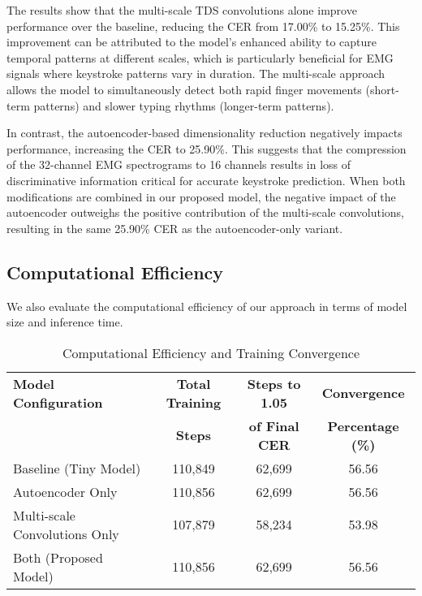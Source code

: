 The results show that the multi-scale TDS convolutions alone improve performance over the baseline, reducing the CER from 17.00\% to 15.25\%. This improvement can be attributed to the model's enhanced ability to capture temporal patterns at different scales, which is particularly beneficial for EMG signals where keystroke patterns vary in duration. The multi-scale approach allows the model to simultaneously detect both rapid finger movements (short-term patterns) and slower typing rhythms (longer-term patterns).

In contrast, the autoencoder-based dimensionality reduction negatively impacts performance, increasing the CER to 25.90\%. This suggests that the compression of the 32-channel EMG spectrograms to 16 channels results in loss of discriminative information critical for accurate keystroke prediction. When both modifications are combined in our proposed model, the negative impact of the autoencoder outweighs the positive contribution of the multi-scale convolutions, resulting in the same 25.90\% CER as the autoencoder-only variant.

\subsection{Computational Efficiency}

We also evaluate the computational efficiency of our approach in terms of model size and inference time.

\begin{table}[h]
    \centering
    \caption{Computational Efficiency and Training Convergence}
    \begin{tabular}{lccc}
        \hline
        \textbf{Model Configuration}  & \textbf{Total Training} & \textbf{Steps to 1.05} & \textbf{Convergence}     \\
                                      & \textbf{Steps}          & \textbf{of Final CER}  & \textbf{Percentage (\%)} \\
        \hline
        Baseline (Tiny Model)         & 110,849                 & 62,699                 & 56.56                    \\
        Autoencoder Only              & 110,856                 & 62,699                 & 56.56                    \\
        Multi-scale Convolutions Only & 107,879                 & 58,234                 & 53.98                    \\
        Both (Proposed Model)         & 110,856                 & 62,699                 & 56.56                    \\
        \hline
    \end{tabular}
    \label{tab:computational_efficiency}
\end{table}


